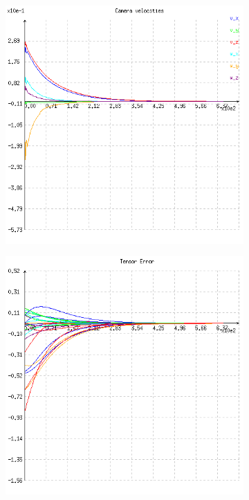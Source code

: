 \begin{figure}[ht!]
\begin{subfigure}{.48\linewidth}
    \caption{}
    \label{fig:ex5cscene}
  \end{subfigure}
  \\
  \begin{subfigure}{.48\linewidth}
    \centering
    \includegraphics[width=\linewidth]{figures/plots/ex5cvelocity.png}
    \caption{}
    \label{fig:ex5cvelocity}
  \end{subfigure}
  \begin{subfigure}{.48\linewidth}
    \centering
    \includegraphics[width=\linewidth]{figures/plots/ex5cerror.png}

\end{subfigure}
\end{figure}
